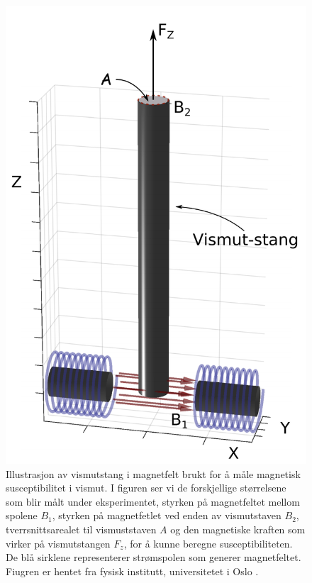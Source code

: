 \documentclass[%
 reprint,
nofootinbib,
aps,
]{revtex4-1}
\begin{document}
\begin{figure}[h!]
  \centering
  \includegraphics[scale=0.38]{oppsett1.png}
  \caption{Illustrasjon av vismutstang i magnetfelt brukt for å måle magnetisk susceptibilitet i vismut. I figuren ser vi de forskjellige størrelsene som blir målt under eksperimentet, styrken på magnetfeltet mellom spolene $B_1$, styrken på magnetfetlet ved enden av vismutstaven $B_2$, tverrsnittsarealet til vismuststaven $A$ og den magnetiske kraften som virker på vismutstangen $F_z$, for å kunne beregne susceptibiliteten. De blå sirklene representerer strømspolen som generer magnetfeltet. Fiugren er hentet fra fysisk institutt, universitetet i Oslo \cite{oppgave}.}
  \label{eksperimentelt_oppsett1}
\end{figure}
\end{document}
